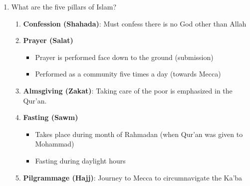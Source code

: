\documentclass[8pt]{article}
\begin{document}
\begin{enumerate}
        \item What are the five pillars of Islam?
            \begin{enumerate}
                \item \textbf{Confession (Shahada)}: Must confess there is no God other than Allah
                \item \textbf{Prayer (Salat)}
                \begin{itemize}
                    \item Prayer is performed face down to the ground (submission)
                    \item Performed as a community five times a day (towards Mecca)
                \end{itemize}
                \item \textbf{Almsgiving (Zakat)}: Taking care of the poor is emphasized in the Qur'an.
                \item \textbf{Fasting (Sawm)}
                \begin{itemize}
                    \item Takes place during month of Rahmadan (when Qur'an was given to Mohammad)
                    \item Fasting during daylight hours
                \end{itemize}
                \item \textbf{Pilgrammage (Hajj)}: Journey to Mecca to circumnavigate the Ka'ba
            \end{enumerate}


\end{enumerate}
\end{document}
